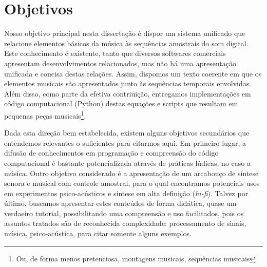     \section{Objetivos}
   \label{sec:objetivos}
Nosso objetivo principal nesta dissertação é dispor um sistema unificado que relacione elementos básicos da música às sequências amostrais do som digital. Este conhecimento é existente, tanto que diversos softwares comerciais apresentam desenvolvimentos relacionados, mas não há uma apresentação unificada e concisa destas relações. Assim, dispomos um texto coerente em que os elementos musicais são apresentados junto às sequências temporais envolvidas. Além disso, como parte da efetiva contriuição, entregamos implementações em código computacional (Python) destas equações e scripts que resultam em pequenas peças musicais\footnote{Ou, de forma menos pretenciosa, montagens musicais, sequências musicais}. 

Dada esta direção bem estabelecida, existem alguns objetivos secundários que entendemos relevantes o suficientes para citarmos aqui. Em primeiro lugar, a difusão de conhecimentos em programação e compreensão do código computacional é bastante potencializada através de práticas lúdicas, no caso a música. Outro objetivo considerado é a apresentação de um arcabouço de síntese sonora e musical com controle amostral, para o qual encontramos potenciais usos em experimentos psico-acústicos e síntese em alta definição (\emph{hi-fi}). Talvez por último, buscamos apresentar estes conteúdos de forma didática, quase um verdaeiro tutorial, possibilitando uma compreensão e uso facilitados, pois os assuntos tratados são de reconhecida complexidade: processamento de sinais, música, psico-acústica, para citar somente alguns exemplos.





























   
